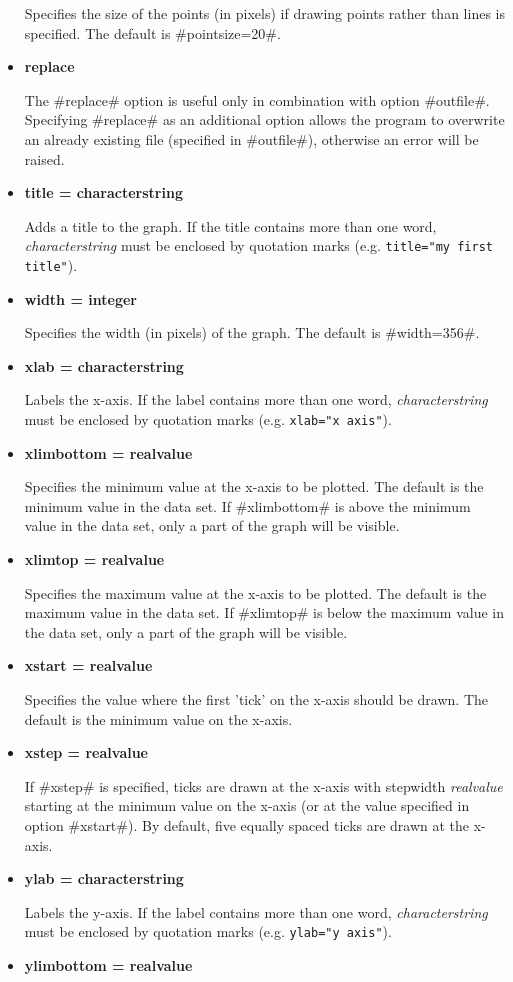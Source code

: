\begin{itemize}
Specifies the size of the points (in pixels) if drawing points
rather than lines is specified. The default is #pointsize=20#.
\item {\bf replace}

The #replace# option is useful only in combination with option
#outfile#. Specifying #replace# as an additional option allows the
program to overwrite an already existing file (specified in
#outfile#), otherwise an error will be raised.

\item {\bf title = characterstring}

Adds a title to the graph. If the title contains more than one
word, {\em characterstring} must be enclosed by quotation marks
(e.g. \texttt{title="my first title"}).
\item {\bf width = integer}

Specifies the width (in pixels) of the graph. The default is
#width=356#.
\item {\bf xlab = characterstring}

Labels the x-axis. If the label contains more than one word, {\em
characterstring} must be enclosed by quotation marks (e.g.
\texttt{xlab="x axis"}).
\item {\bf xlimbottom = realvalue}

Specifies the minimum value at the x-axis to be plotted. The
default is the minimum value in the data set. If #xlimbottom# is
above the minimum value in the data set, only a part of the graph
will be visible.
\item {\bf xlimtop = realvalue}

Specifies the maximum value at the x-axis to be plotted. The
default is the maximum value in the data set. If #xlimtop# is
below the maximum value in the data set, only a part of the graph
will be visible.
\item {\bf xstart = realvalue}

Specifies the value where the first 'tick' on the x-axis should be
drawn. The default is the minimum value on the x-axis.
\item {\bf xstep = realvalue}

If #xstep# is specified,  ticks are drawn at the x-axis with
stepwidth {\em realvalue} starting at the minimum value on the
x-axis (or at the value specified in option #xstart#). By default,
five equally spaced ticks are drawn at the x-axis.
\item {\bf ylab = characterstring}

Labels the y-axis. If the label contains more than one word, {\em
characterstring} must be enclosed by quotation marks (e.g.
\texttt{ylab="y axis"}).
\item {\bf ylimbottom = realvalue}


\end{itemize}
